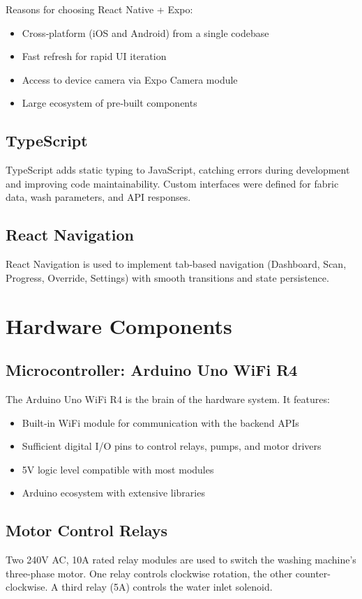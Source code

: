 Reasons for choosing React Native + Expo:
\begin{itemize}
    \item Cross‑platform (iOS and Android) from a single codebase
    \item Fast refresh for rapid UI iteration
    \item Access to device camera via Expo Camera module
    \item Large ecosystem of pre‑built components
\end{itemize}

\subsection{TypeScript}
TypeScript adds static typing to JavaScript, catching errors during development and improving code maintainability. Custom interfaces were defined for fabric data, wash parameters, and API responses.

\subsection{React Navigation}
React Navigation is used to implement tab‑based navigation (Dashboard, Scan, Progress, Override, Settings) with smooth transitions and state persistence.

\section{Hardware Components}

\subsection{Microcontroller: Arduino Uno WiFi R4}
The Arduino Uno WiFi R4 is the brain of the hardware system. It features:
\begin{itemize}
    \item Built‑in WiFi module for communication with the backend APIs
    \item Sufficient digital I/O pins to control relays, pumps, and motor drivers
    \item 5V logic level compatible with most modules
    \item Arduino ecosystem with extensive libraries
\end{itemize}

\subsection{Motor Control Relays}
Two 240V AC, 10A rated relay modules are used to switch the washing machine’s three-phase motor. One relay controls clockwise rotation, the other counter-clockwise. A third relay (5A) controls the water inlet solenoid.


